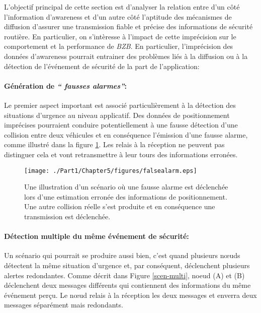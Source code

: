 L'objectif principal de cette section est d'analyser la relation entre d'un côté l'information d'awareness et d'un autre côté l'aptitude des mécanismes de diffusion d'assurer une transmission fiable et précise des informations de sécurité routière. En particulier, on s'intèresse à l'impact de cette imprécision sur le comportement et la performance de \textit{BZB}. En particulier, l'imprécision des données d'awareness pourrait entrainer des problèmes liés à la diffusion ou à la détection de l'événement de sécurité de la part de l'application:

\paragraph{Génération de \textit {`` fausses alarmes''}:}
Le premier aspect important est associé particulièrement à la détection des situations d'urgence au niveau applicatif. Des données de positionnement imprécises pourraient conduire potentiellement à une fausse détection d'une collision entre deux véhicules et en conséquence l'émission d'une fausse alarme, comme illustré dans la figure \ref{scen-false}. Les relais à la réception ne peuvent pas distinguer cela et vont retransmettre à leur tours des informations erronées.

\begin{figure}[!h]
\centering
\texttt{[image: ./Part1/Chapter5/figures/falsealarm.eps]}
\caption[Une illustration d'un scénario où une fausse alarme est déclenchée lors d'une estimation erronée des informations de positionnement] {Une illustration d'un scénario où une fausse alarme est déclenchée lors d'une estimation erronée des informations de positionnement. Une autre collision réelle s'est produite et en conséquence une transmission est déclenchée.}
\label{scen-false}
\end{figure}


\paragraph{Détection multiple du m\^eme événement de sécurité:}

Un scénario qui pourrait se produire aussi bien, c'est quand plusieurs nœuds détectent la même situation d'urgence et, par conséquent, déclenchent plusieurs alertes redondantes. Comme décrit dans Figure \ref{scen-multi}, noeud (A) et (B) déclenchent deux messages différents qui contiennent des informations du même événement perçu. Le nœud relais à la réception les deux messages et enverra deux messages séparément mais redondants.

